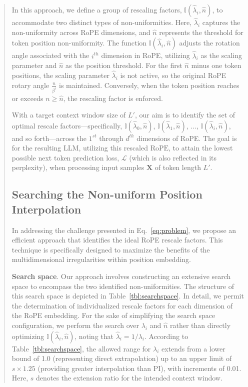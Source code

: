 \begin{abstract}
In this approach, we define a group of rescaling factors, $\mathbb{I}(\hat{\lambda}_{i},\hat{n})$, to accommodate two distinct types of non-uniformities. Here, $\hat{\lambda}_i$ captures the non-uniformity across RoPE dimensions, and $\hat{n}$ represents the threshold for token position non-uniformity. The function $\mathbb{I}(\hat{\lambda}_{i},\hat{n})$ adjusts the rotation angle associated with the $i^{th}$ dimension in RoPE, utilizing $\hat{\lambda}_i$ as the scaling parameter and $\hat{n}$ as the position threshold. For the first $\hat{n}$ minus one token positions, the scaling parameter $\hat{\lambda}_i$ is not active, so the original RoPE rotary angle $\frac{n}{\beta^i}$ is maintained. Conversely, when the token position reaches or exceeds $n \ge \hat{n}$, the rescaling factor is enforced.

With a target context window size of $L'$, our aim is to identify the set of optimal rescale factors—specifically, $\mathbb{I}(\hat{\lambda}_{0},\hat{n})$, $\mathbb{I}(\hat{\lambda}_{1},\hat{n})$, ..., $\mathbb{I}(\hat{\lambda}_{i},\hat{n})$, and so forth—across the $1^{st}$ through $d^{th}$ dimensions of RoPE. The goal is for the resulting $\text{LLM}$, utilizing this rescaled $\text{RoPE}$, to attain the lowest possible next token prediction loss, $\mathcal{L}$ (which is also reflected in its perplexity), when processing input samples $\mathbf{X}$ of token length $L'$.

\subsection{Searching the Non-uniform Position Interpolation}

In addressing the challenge presented in Eq.~\ref{eq:problem}, we propose an efficient approach that identifies the ideal RoPE rescale factors. This technique is specifically designed to maximize the benefits of the multidimensional irregularities within position embedding.

\textbf{Search space}. Our approach involves constructing an extensive search space to encompass the two identified non-uniformities. The structure of this search space is depicted in Table~\ref{tbl:searchspace}. In detail, we permit the determination of individualized rescale factors for each dimension of the RoPE embedding. For the sake of simplifying the search space configuration, we perform the search over $\lambda_i$ and $\hat{n}$ rather than directly optimizing $\mathbb{I}(\hat{\lambda}_{i},\hat{n})$, noting that $\hat{\lambda}_{i}=1/\lambda_i$. According to Table~\ref{tbl:searchspace}, the allowed range for $\lambda_i$ extends from a lower bound of 1.0 (representing direct extrapolation) up to an upper limit of $s\times1.25$ (providing greater interpolation than PI), with increments of 0.01. Here, $s$ denotes the extension ratio for the intended context window.


\end{abstract}
